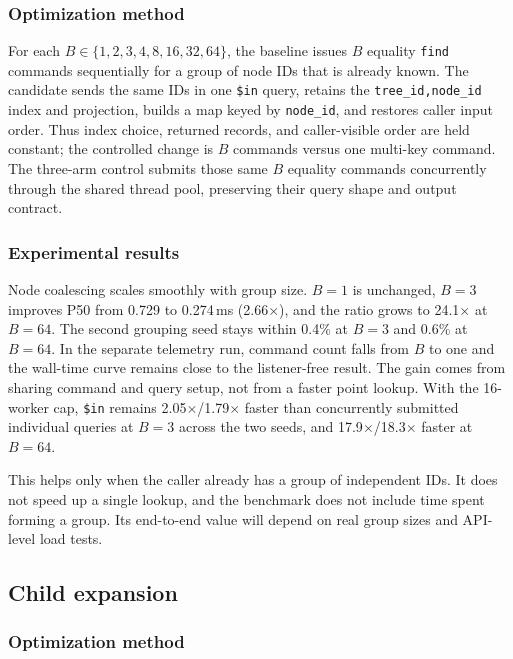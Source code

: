 \documentclass[10pt]{article}
\newcommand{\code}[1]{\texttt{#1}}
\begin{document}
\subsubsection{Optimization method}

For each $B\in\{1,2,3,4,8,16,32,64\}$, the baseline issues $B$ equality
\code{find} commands sequentially for a group of node IDs that is already
known. The candidate sends the same IDs in one \code{\$in} query, retains the
\code{tree\_id,node\_id} index and projection, builds a map keyed by
\code{node\_id}, and restores caller input order. Thus index choice, returned
records, and caller-visible order are held constant; the controlled change is
$B$ commands versus one multi-key command. The three-arm control submits those
same $B$ equality commands concurrently through the shared thread pool,
preserving their query shape and output contract.

\subsubsection{Experimental results}

Node coalescing scales smoothly with group size. $B=1$ is unchanged,
$B=3$ improves P50 from 0.729 to 0.274\,ms
(2.66$\times$), and the ratio grows to 24.1$\times$ at $B=64$. The second
grouping seed stays within 0.4\% at $B=3$ and 0.6\% at
$B=64$. In the separate telemetry run, command count falls from $B$ to one and
the wall-time curve remains close to the listener-free result. The gain comes
from sharing command and query setup, not from a faster point lookup. With the
16-worker cap, \code{\$in} remains 2.05$\times$/1.79$\times$ faster than
concurrently submitted individual queries at $B=3$ across the two seeds, and
17.9$\times$/18.3$\times$ faster at $B=64$.

This helps only when the caller already has a group of independent IDs. It
does not speed up a single lookup, and the benchmark does not include time
spent forming a group. Its end-to-end value will depend on real group sizes and
API-level load tests.

\subsection{Child expansion}\label{sec:opt-children}

\subsubsection{Optimization method}
\end{document}
